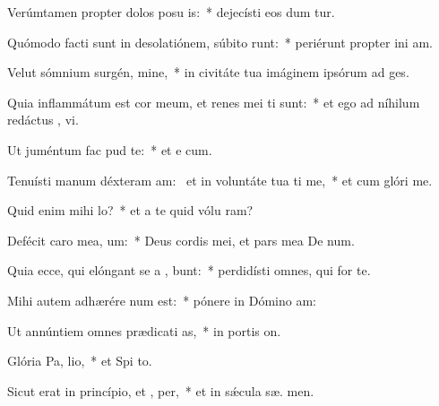 \item Verúmtamen propter dolos posu is:~* dejecísti eos dum tur.
\item Quómodo facti sunt in desolatiónem, súbito runt:~* periérunt propter ini am.
\item Velut sómnium surgén, mine,~* in civitáte tua imáginem ipsórum ad  ges.
\item Quia inflammátum est cor meum, et renes mei ti sunt:~* et ego ad níhilum redáctus ,  vi.
\item Ut juméntum fac  pud te:~* et e  cum.
\item Tenuísti manum déxteram am:~\pscross{} et in voluntáte tua ti me,~* et cum glóri  me.
\item Quid enim mihi   lo?~* et a te quid vólu  ram?
\item Defécit caro mea,   um:~* Deus cordis mei, et pars mea De  num.
\item Quia ecce, qui elóngant se a , bunt:~* perdidísti omnes, qui for  te.
\item Mihi autem adhærére  num est:~* pónere in Dómino   am:
\item Ut annúntiem omnes prædicati as,~* in portis  on.
\item Glória Pa,  lio,~* et Spi to.
\item Sicut erat in princípio, et ,  per,~* et in sǽcula sæ. men.
